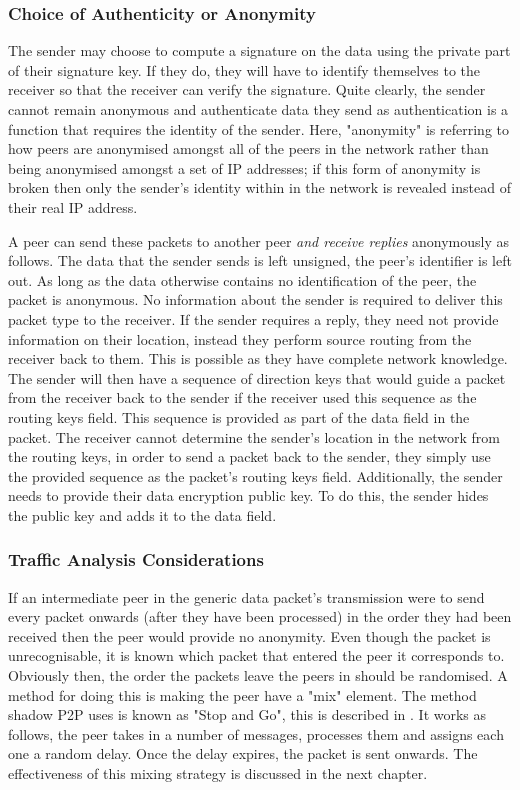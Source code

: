 \documentclass[ %
                    author={Luke Murray},
                supervisor={Dr. Simon Hollis},
                     title={Shadow Peer-to-Peer Networks},
                  subtitle={},
                    degree={MEng},
                      year={2013} ]{thesis}
\begin{document}
\subsubsection{Choice of Authenticity or Anonymity}

The sender may choose to compute a signature on the data using the private part of their signature key. If they do, they will have to identify themselves to the receiver so that the receiver can verify the signature. Quite clearly, the sender cannot remain anonymous and authenticate data they send as authentication is a function that requires the identity of the sender. Here, "anonymity" is referring to how peers are anonymised amongst all of the peers in the network rather than being anonymised amongst a set of IP addresses; if this form of anonymity is broken then only the sender's identity within in the network is revealed instead of their real IP address.

A peer can send these packets to another peer {\em and receive replies} anonymously as follows. The data that the sender sends is left unsigned, the peer's identifier is left out. As long as the data otherwise contains no identification of the peer, the packet is anonymous. No information about the sender is required to deliver this packet type to the receiver. If the sender requires a reply, they need not provide information on their location, instead they perform source routing from the receiver back to them. This is possible as they have complete network knowledge. The sender will then have a sequence of direction keys that would guide a packet from the receiver back to the sender if the receiver used this sequence as the routing keys field. This sequence is provided as part of the data field in the packet. The receiver cannot determine the sender's location in the network from the routing keys, in order to send a packet back to the sender, they simply use the provided sequence as the packet's routing keys field. Additionally, the sender needs to provide their data encryption public key. To do this, the sender hides the public key and adds it to the data field.

\subsubsection{Traffic Analysis Considerations}

If an intermediate peer in the generic data packet's transmission were to send every packet onwards (after they have been processed) in the order they had been received then the peer would provide no anonymity. Even though the packet is unrecognisable, it is known which packet that entered the peer it corresponds to. Obviously then, the order the packets leave the peers in should be randomised. A method for doing this is making the peer have a "mix" element. The method shadow P2P uses is known as "Stop and Go", this is described in \cite{kesdogan1998stop}. It works as follows, the peer takes in a number of messages, processes them and assigns each one a random delay. Once the delay expires, the packet is sent onwards. The effectiveness of this mixing strategy is discussed in the next chapter.
\end{document}
